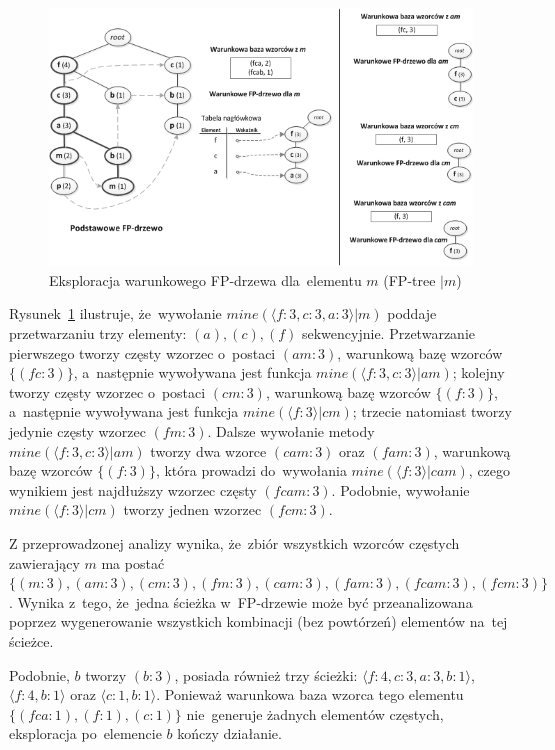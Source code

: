 \begin{figure}[ht]
\centering\includegraphics{figures/02/mining_fptree.png}
\caption{Eksploracja warunkowego FP-drzewa dla~elementu $m$ (FP-tree $| m$)~\cite{Main:FPgrowth}}\label{rys:mining_fptree}
\end{figure}

Rysunek~\ref{rys:mining_fptree} ilustruje, że~wywołanie $mine(\langle f: 3, c: 3, a: 3 \rangle | m)$ poddaje przetwarzaniu trzy elementy: $(a), (c), (f)$ sekwencyjnie. Przetwarzanie pierwszego tworzy częsty wzorzec o~postaci $(am: 3)$, warunkową bazę wzorców $\lbrace (fc: 3) \rbrace$, a~następnie wywoływana jest funkcja $mine(\langle f: 3, c: 3 \rangle | am)$; kolejny tworzy częsty wzorzec o~postaci $(cm: 3)$, warunkową bazę wzorców $\lbrace (f: 3)\rbrace$, a~następnie wywoływana jest funkcja $mine(\langle f: 3 \rangle | cm)$; trzecie natomiast tworzy jedynie częsty wzorzec $(fm: 3)$. Dalsze wywołanie metody $mine(\langle f: 3, c: 3 \rangle | am)$ tworzy dwa wzorce $(cam: 3)$ oraz $(fam: 3)$, warunkową bazę wzorców $\lbrace ( f: 3 ) \rbrace$, która prowadzi do~wywołania $mine(\langle f: 3 \rangle | cam)$, czego wynikiem jest najdłuższy wzorzec częsty $(fcam: 3)$. Podobnie, wywołanie $mine(\langle f: 3 \rangle | cm)$ tworzy jednen wzorzec $(fcm: 3)$. 

Z przeprowadzonej analizy wynika, że~zbiór wszystkich wzorców częstych zawierający $m$ ma postać $\lbrace (m: 3), (am: 3), (cm: 3), (fm: 3), (cam: 3), (fam: 3), (fcam: 3), (fcm: 3) \rbrace$. Wynika z~tego, że~jedna ścieżka w~FP-drzewie może być przeanalizowana poprzez wygenerowanie wszystkich kombinacji (bez powtórzeń) elementów na~tej ścieżce.

Podobnie, $b$ tworzy $(b: 3)$, posiada również trzy ścieżki: $\langle f:4, c:3, a:3, b:1 \rangle$, $\langle f:4, b:1 \rangle$ oraz $\langle c:1, b:1 \rangle$. Ponieważ warunkowa baza wzorca tego elementu $\lbrace (fca:1), (f:1), (c:1)\rbrace$ nie~generuje żadnych elementów częstych, eksploracja po~elemencie $b$ kończy działanie. 

